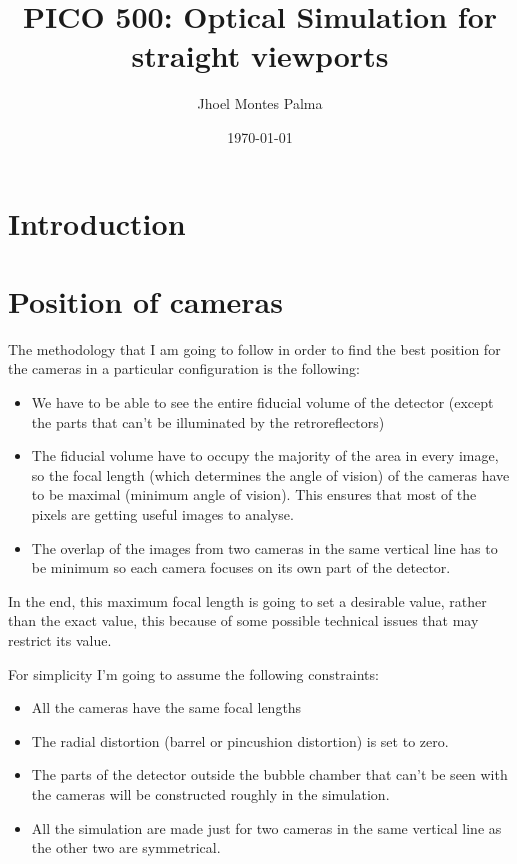 \documentclass{article}
\title{PICO 500: Optical Simulation for straight viewports}
\author{Jhoel Montes Palma }
\date{\today}
\begin{document}
\maketitle

\section{Introduction}

\section{Position of cameras}

The methodology that I am going to follow in order to find the best position for the cameras in a particular configuration is the following:

\begin{itemize}
  \item We have to be able to see the entire fiducial volume of the detector (except the parts that can't be illuminated by the retroreflectors)
  \item The fiducial volume have to occupy the majority of the area in every image, so the focal length (which determines the angle of vision) of the cameras have to be maximal (minimum angle of vision). This ensures that most of the pixels are getting useful images to analyse.
  \item The overlap of the images from two cameras in the same vertical line has to be minimum so each camera focuses on its own part of the detector.
\end{itemize}

In the end, this maximum focal length is going to set a desirable value, rather than the exact value, this because of some possible technical issues that may restrict its value.

For simplicity I'm going to assume the following constraints:

\begin{itemize}
    \item All the cameras have the same focal lengths
    \item The radial distortion (barrel or pincushion distortion) is set to zero.
    \item The parts of the detector outside the bubble chamber that can't be seen with the cameras will be constructed roughly in the simulation.
    \item All the simulation are made just for two cameras in the same vertical line as the other two are symmetrical.
\end{itemize}
\end{document}
